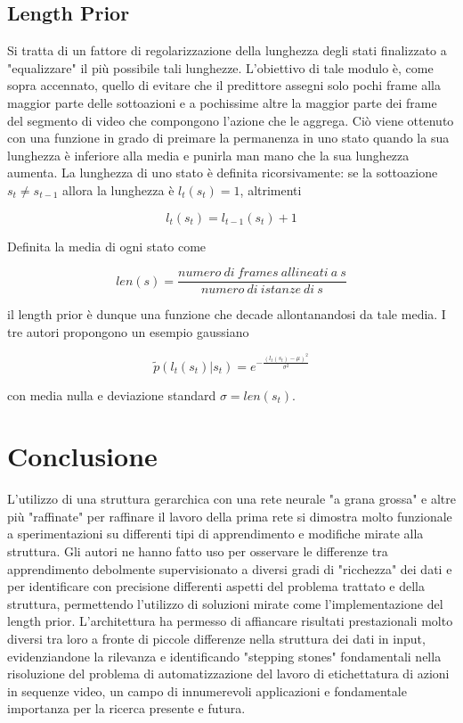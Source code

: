 \documentclass[10pt,letterpaper]{article}
\begin{document}
\subsection{Length Prior}
Si tratta di un fattore di regolarizzazione della lunghezza degli stati finalizzato a "equalizzare" il più possibile tali lunghezze. L'obiettivo di tale modulo è, come sopra accennato, quello di evitare che il predittore assegni solo pochi frame alla maggior parte delle sottoazioni e a pochissime altre la maggior parte dei frame del segmento di video che compongono l'azione che le aggrega. Ciò viene ottenuto con una funzione in grado di preimare la permanenza in uno stato quando la sua lunghezza è inferiore alla media e punirla man mano che la sua lunghezza aumenta. La lunghezza di uno stato è definita ricorsivamente: se la sottoazione $s_t \neq s_{t-1}$ allora la lunghezza è $l_t(s_t) = 1$, altrimenti

\begin{equation}
l_t(s_t) = l_{t-1}(s_t) + 1
\end{equation}

Definita la media di ogni stato come

\begin{equation}
len(s) = \frac{numero\:di\:frames\:allineati\:a\:{s}}{numero\:di\:istanze\:di\:{s}}
\end{equation}

il length prior è dunque una funzione che decade allontanandosi da tale media. I tre autori propongono un esempio gaussiano

\begin{equation}
\tilde{p}(l_t(s_t)|s_t) = e^{-\frac{(l_t(s_t) - \mu)^2}{\sigma^2}}
\end{equation}

con media nulla e deviazione standard $\sigma = len(s_t)$.

\section{Conclusione}
L'utilizzo di una struttura gerarchica con una rete neurale "a grana grossa" e altre più "raffinate" per raffinare il lavoro della prima rete si dimostra molto funzionale a sperimentazioni su differenti tipi di apprendimento e modifiche mirate alla struttura. Gli autori ne hanno fatto uso per osservare le differenze tra apprendimento debolmente supervisionato a diversi gradi di "ricchezza" dei dati e per identificare con precisione differenti aspetti del problema trattato e della struttura, permettendo l'utilizzo di soluzioni mirate come l'implementazione del length prior. L'architettura ha permesso di affiancare risultati prestazionali molto diversi tra loro a fronte di piccole differenze nella struttura dei dati in input, evidenziandone la rilevanza e identificando "stepping stones" fondamentali nella risoluzione del problema di automatizzazione del lavoro di etichettatura di azioni in sequenze video, un campo di innumerevoli applicazioni e fondamentale importanza per la ricerca presente e futura.
\end{document}
